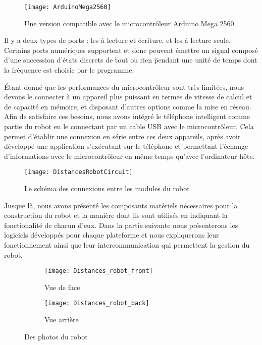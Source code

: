 \begin{figure}[h]
\begin{center}
\texttt{[image: ArduinoMega2560]}
\caption{Une version compatible avec le microcontrôleur Arduino Mega 2560}
\end{center}
\end{figure}

Il y a deux types de ports : les  à lecture et
écriture, et les  à lecture seule. Certains ports
numériques supportent  et donc peuvent
émettre un signal composé d'une succession d'états discrets de \" tout ou rien \"
pendant une unité de temps dont la fréquence est choisie par le programme.

Étant donné que les performances du microcontrôleur sont très limitées, nous
devons le connecter à un appareil plus puissant en termes de vitesse
de calcul et de capacité en mémoire, et disposant d'autres options comme la
mise en réseau. Afin de satisfaire ces besoins, nous avons intégré le téléphone
intelligent  comme partie du robot en le connectant
par un cable USB avec le microcontrôleur. Cela permet d'établir une connexion en série entre
ces deux appareils, après avoir développé une application s'exécutant
sur le téléphone et permettant l'échange d'informations avec le microcontrôleur
en même temps qu'avec l'ordinateur hôte.

\begin{figure}[H]
\begin{center}
\texttt{[image: DistancesRobotCircuit]}
\caption{Le schéma des connexions entre les modules du robot}
\end{center}
\end{figure}

Jusque là, nous avons présenté les composants matériels nécessaires pour la
construction du robot et la manière dont ils sont utilisés en indiquant la
fonctionalité de chacun d'eux. Dans la partie suivante nous présenterons les
logiciels développés pour chaque plateforme et nous expliquerons leur fonctionnement
ainsi que leur intercommunication qui permettent la gestion du robot.

\begin{figure}[h]
\begin{center}
  \begin{subfigure}{0.49\textwidth}
    \texttt{[image: Distances\_robot\_front]}
    \caption{Vue de face}
  \end{subfigure}
  \hfill
  \begin{subfigure}{0.49\textwidth}
    \texttt{[image: Distances\_robot\_back]}
    \caption{Vue arrière}
  \end{subfigure}
  \caption{Des photos du robot}
\end{center}
\end{figure}

